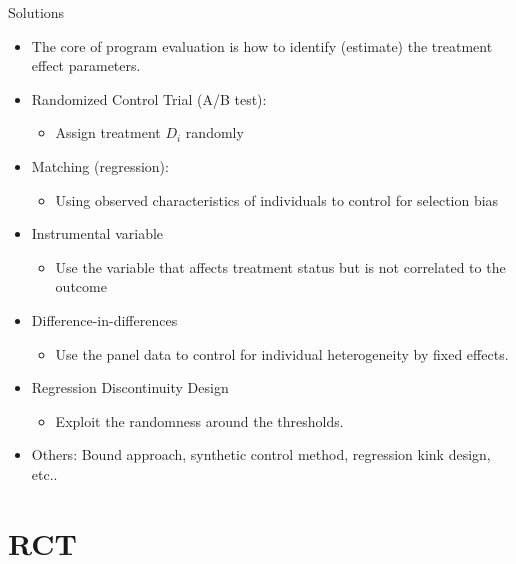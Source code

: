 \documentclass[
  ignorenonframetext,
]{beamer}
\providecommand{\tightlist}{%
  \setlength{\itemsep}{0pt}\setlength{\parskip}{0pt}}
\begin{document}
\begin{frame}{Solutions}
\protect\hypertarget{solutions}{}
\begin{itemize}
\item
  The core of program evaluation is how to identify (estimate) the
  treatment effect parameters.
\item
  Randomized Control Trial (A/B test):

  \begin{itemize}
  \tightlist
  \item
    Assign treatment \(D_{i}\) randomly
  \end{itemize}
\item
  Matching (regression):

  \begin{itemize}
  \tightlist
  \item
    Using observed characteristics of individuals to control for
    selection bias
  \end{itemize}
\item
  Instrumental variable

  \begin{itemize}
  \tightlist
  \item
    Use the variable that affects treatment status but is not correlated
    to the outcome
  \end{itemize}
\item
  Difference-in-differences

  \begin{itemize}
  \tightlist
  \item
    Use the panel data to control for individual heterogeneity by fixed
    effects.
  \end{itemize}
\item
  Regression Discontinuity Design

  \begin{itemize}
  \tightlist
  \item
    Exploit the randomness around the thresholds.
  \end{itemize}
\item
  Others: Bound approach, synthetic control method, regression kink
  design, etc..
\end{itemize}
\end{frame}

\hypertarget{rct}{%
\section{RCT}\label{rct}}
\end{document}
